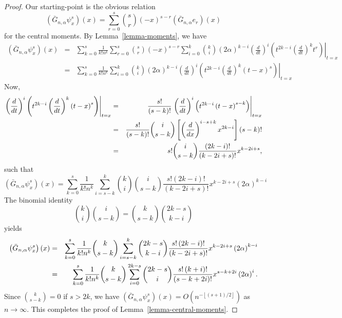 \documentclass[11pt,a4paper]{article}
\begin{document}
\begin{proof}
Our starting-point is the obvious relation 
\begin{equation*}
\left( \bar{G}_{n,\alpha }\psi _{x}^{s}\right) \left( x\right)
=\sum_{r=0}^{s}\binom{s}{r}\left( -x\right) ^{s-r}\left( \bar{G}_{n,\alpha
}e_{r}\right) \left( x\right)
\end{equation*}%
for the central moments. By Lemma~\ref{lemma-moments}, we have\ 
\begin{eqnarray*}
\left( \bar{G}_{n,\alpha }\psi _{x}^{s}\right) \left( x\right)
&=&\sum_{k=0}^{s}\frac{1}{k!n^{k}}\sum_{r=0}^{s}\binom{s}{r}\left( -x\right)
^{s-r}\sum_{i=0}^{k}\binom{k}{i}\left( 2\alpha \right) ^{k-i}\left. \left( 
\frac{d}{dt}\right) ^{i}\left( t^{2k-i}\left( \frac{d}{dt}\right)
^{k}t^{r}\right) \right\vert _{t=x} \\
&=&\sum_{k=0}^{s}\frac{1}{k!n^{k}}\sum_{i=0}^{k}\binom{k}{i}\left( 2\alpha
\right) ^{k-i}\left. \left( \frac{d}{dt}\right) ^{i}\left( t^{2k-i}\left( 
\frac{d}{dt}\right) ^{k}\left( t-x\right) ^{s}\right) \right\vert _{t=x}
\end{eqnarray*}%
Now, 
\begin{eqnarray*}
\left. \left( \frac{d}{dt}\right) ^{i}\left( t^{2k-i}\left( \frac{d}{dt}%
\right) ^{k}\left( t-x\right) ^{s}\right) \right\vert _{t=x} &=&\frac{s!}{%
\left( s-k\right) !}\left. \left( \frac{d}{dt}\right) ^{i}\left(
t^{2k-i}\left( t-x\right) ^{s-k}\right) \right\vert _{t=x} \\
&=&\frac{s!}{\left( s-k\right) !}\binom{i}{s-k}\left[ \left( \frac{d}{dx}%
\right) ^{i-s+k}x^{2k-i}\right] \left( s-k\right) ! \\
&=&s!\binom{i}{s-k}\frac{\left( 2k-i\right) !}{\left( k-2i+s\right) !}%
x^{k-2i+s},
\end{eqnarray*}%
such that 
\begin{equation*}
\left( \bar{G}_{n,\alpha }\psi _{x}^{s}\right) \left( x\right)
=\sum_{k=0}^{s}\frac{1}{k!n^{k}}\sum_{i=s-k}^{k}\binom{k}{i}\binom{i}{s-k}%
\frac{s!\left( 2k-i\right) !}{\left( k-2i+s\right) !}x^{k-2i+s}\left(
2\alpha \right) ^{k-i}
\end{equation*}%
The binomial identity 
\begin{equation*}
\binom{k}{i}\binom{i}{s-k}=\binom{k}{s-k}\binom{2k-s}{k-i}
\end{equation*}%
yields 
\begin{eqnarray*}
\left( \bar{G}_{n,\alpha }\psi _{x}^{s}\right) \left( x\right)
&=&\sum_{k=0}^{s}\frac{1}{k!n^{k}}\binom{k}{s-k}\sum_{i=s-k}^{k}\binom{2k-s}{%
k-i}\frac{s!\left( 2k-i\right) !}{\left( k-2i+s\right) !}x^{k-2i+s}\left(
2\alpha \right) ^{k-i} \\
&=&\sum_{k=0}^{s}\frac{1}{k!n^{k}}\binom{k}{s-k}\sum_{i=0}^{2k-s}\binom{2k-s%
}{i}\frac{s!\left( k+i\right) !}{\left( s-k+2i\right) !}x^{s-k+2i}\left(
2\alpha \right) ^{i}.
\end{eqnarray*}%
Since $\binom{k}{s-k}=0$ if $s>2k$, we have $\left( \bar{G}_{n,\alpha }\psi
_{x}^{s}\right) \left( x\right) =O\left( n^{-\left\lfloor \left( s+1\right)
/2\right\rfloor }\right) $ as $n\rightarrow \infty $. This completes the
proof of Lemma~\ref{lemma-central-moments}.
\end{proof}
\end{document}
